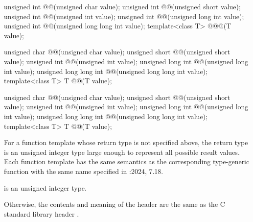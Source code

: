 \begin{codeblock}
unsigned int @@(unsigned char value);
unsigned int @@(unsigned short value);
unsigned int @@(unsigned int value);
unsigned int @@(unsigned long int value);
unsigned int @@(unsigned long long int value);
template<class T> @\seebelow@ @@(T value);

unsigned char @@(unsigned char value);
unsigned short @@(unsigned short value);
unsigned int @@(unsigned int value);
unsigned long int @@(unsigned long int value);
unsigned long long int @@(unsigned long long int value);
template<class T> T @@(T value);

unsigned char @@(unsigned char value);
unsigned short @@(unsigned short value);
unsigned int @@(unsigned int value);
unsigned long int @@(unsigned long int value);
unsigned long long int @@(unsigned long long int value);
template<class T> T @@(T value);
\end{codeblock}

\pnum
For a function template whose return type is not specified above,
the return type is
an  unsigned integer type
large enough to represent all possible result values.
Each function template has the same semantics
as the corresponding type-generic function with the same name
specified in \IsoCUndated{}:2024, 7.18.  %

\pnum
\mandates
{} is an unsigned integer type.

\pnum
Otherwise,
the contents and meaning of the header  are the same as
the C standard library header .

